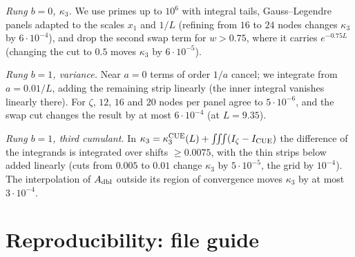 \documentclass[12pt]{amsart}
\theoremstyle{remark}
\newcommand{\1}{\mathbf{1}}
\begin{document}
\emph{Rung $b=0$, $\kappa_3$.} We use primes up to $10^6$ with integral
tails, Gauss--Legendre panels adapted to the scales $x_1$ and $1/L$
(refining from $16$ to $24$ nodes changes $\kappa_3$ by $6\cdot10^{-4}$),
and drop the second swap term for $w>0.75$, where it carries $e^{-0.75L}$
(changing the cut to $0.5$ moves $\kappa_3$ by $6\cdot10^{-5}$).

\emph{Rung $b=1$, variance.} Near $a=0$ terms of order $1/a$ cancel; we
integrate from $a=0.01/L$, adding the remaining strip linearly (the inner
integral vanishes linearly there). For $\zeta$, $12$, $16$ and $20$ nodes
per panel agree to $5\cdot10^{-6}$, and the swap cut changes the result by
at most $6\cdot10^{-4}$ (at $L=9.35$).

\emph{Rung $b=1$, third cumulant.} In $\kappa_3=\kappa_3^{\rm
CUE}(L)+\iiint(I_\zeta-I_{\rm CUE})$ the difference of the integrands is
integrated over shifts $\ge0.0075$, with the thin strips below added
linearly (cuts from $0.005$ to $0.01$ change $\kappa_3$ by
$5\cdot10^{-5}$, the grid by $10^{-4}$). The interpolation of $A_{\rm
dbl}$ outside its region of convergence moves $\kappa_3$ by at most
$3\cdot10^{-4}$.

\section{Reproducibility: file guide}\label{sec:repro}
\end{document}
